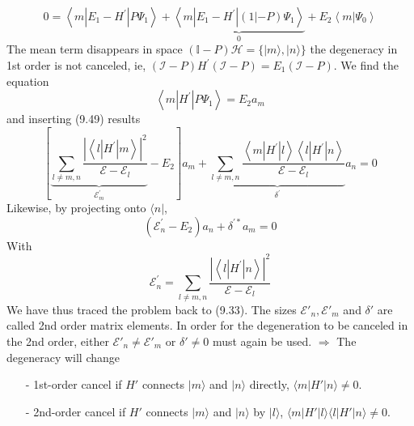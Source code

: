 \begin{equation}
    0=\left\langle m\left|E_{1}-H^{\prime}\right| P \Psi_{1}\right\rangle+\underbrace{\left\langle m\left|E_{1}-H^{\prime}\right|(1 |-P) \Psi_{1}\right\rangle}_{0}+E_{2}\left\langle m | \Psi_{0}\right\rangle
    \end{equation}
The mean term disappears in space $(\mathbb{I}-P) \mathcal{H}=\{|m\rangle,|n\rangle\}$ the degeneracy in 1st order is not canceled, ie, $(\mathcal{I}-P) H^{\prime}(\mathcal{I}-P)=E_1(\mathcal{I}-P)$. We find the equation
\begin{equation}
    \left\langle m\left|H^{\prime}\right| P \Psi_{1}\right\rangle= E_{2} a_{m}
    \end{equation}
and inserting (9.49) results
\begin{equation}
    \left[\underbrace{\sum_{l \neq m, n} \frac{\left|\left\langle l\left|H^{\prime}\right| m\right\rangle\right|^{2}}{\mathcal{E}-\mathcal{E}_{l}}}_{\mathcal{E}_{m}^{\prime}}-E_{2}\right] a_{m}+\underbrace{\sum_{l \neq m, n} \frac{\left\langle m\left|H^{\prime}\right| l\right\rangle\left\langle l\left|H^{\prime}\right| n\right\rangle}{\mathcal{E}-\mathcal{E}_{l}}}_{\delta^{\prime}} a_{n}=0
    \end{equation}
Likewise, by projecting onto $\langle n |$,
\begin{equation}
    \left(\mathcal{E}_{n}^{\prime}-E_{2}\right) a_{n}+\delta^{\prime *} a_{m}=0
    \end{equation}
With
\begin{equation}
    \mathcal{E}_{n}^{\prime}=\sum_{l \neq m, n} \frac{\left|\left\langle l\left|H^{\prime}\right| n\right\rangle\right|^{2}}{\mathcal{E}-\mathcal{E}_{l}}
    \end{equation}
We have thus traced the problem back to (9.33). The sizes $\mathcal{E}'_n,\mathcal{E}'_m$ and $\delta'$ are called 2nd order matrix elements. In order for the degeneration to be canceled in the 2nd order, either $\mathcal{E}'_n\neq\mathcal{E}'_m$ or $\delta'\neq 0$ must again be used. $\Rightarrow$ The degeneracy will change
\begin{enumerate}
    \item[-] 1st-order cancel if $H'$ connects $| m\rangle$ and $| n\rangle$ directly, $\langle m|H'|n\rangle\neq 0$.
    \item[-] 2nd-order cancel if $H'$ connects $| m\rangle$ and $| n\rangle$ by $|l\rangle$, $\langle m|H'|l\rangle\langle l|H'|n\rangle\neq 0$. 
\end{enumerate}
